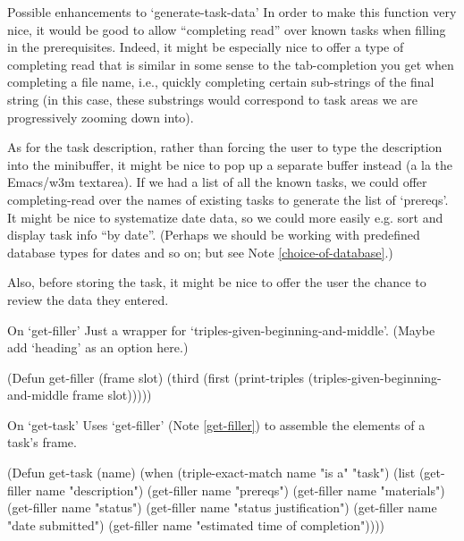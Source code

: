 \begin{notate}{Possible enhancements to `generate-task-data'}
In order to make this function very nice, it would be good
to allow ``completing read'' over known tasks when filling
in the prerequisites.  Indeed, it might be especially nice
to offer a type of completing read that is similar in some
sense to the tab-completion you get when completing a file
name, i.e., quickly completing certain sub-strings of the
final string (in this case, these substrings would
correspond to task areas we are progressively zooming down
into).

As for the task description, rather than forcing the user
to type the description into the minibuffer, it might be
nice to pop up a separate buffer instead (a la the
Emacs/w3m textarea).  If we had a list of all the known
tasks, we could offer completing-read over the names of
existing tasks to generate the list of `prereqs'.  It
might be nice to systematize date data, so we could more
easily e.g. sort and display task info ``by date''.
(Perhaps we should be working with predefined database
types for dates and so on; but see Note
\ref{choice-of-database}.)

Also, before storing the task, it might be nice to offer
the user the chance to review the data they entered.
\end{notate}

\begin{notate}{On `get-filler'} \label{get-filler}
Just a wrapper for `triples-given-beginning-and-middle'.
(Maybe add `heading' as an option here.)
\end{notate}

\begin{elisp}
(Defun get-filler (frame slot)
  (third (first
          (print-triples
           (triples-given-beginning-and-middle frame
                                               slot)))))
\end{elisp}

\begin{notate}{On `get-task'} \label{get-task}
Uses `get-filler' (Note \ref{get-filler}) to assemble the
elements of a task's frame.
\end{notate}

\begin{elisp}
(Defun get-task (name)
  (when (triple-exact-match name "is a" "task")
    (list (get-filler name "description")
          (get-filler name "prereqs")
          (get-filler name "materials")
          (get-filler name "status")
          (get-filler name "status justification")
          (get-filler name "date submitted")
          (get-filler name
                      "estimated time of completion"))))
\end{elisp}


